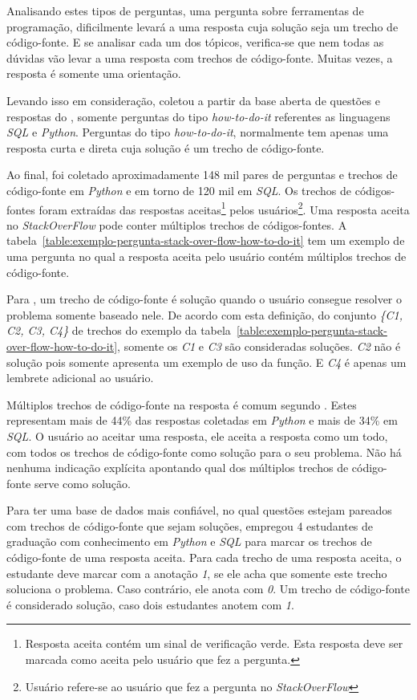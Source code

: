 Analisando estes tipos de perguntas, uma pergunta sobre ferramentas de programação, dificilmente levará a uma resposta cuja solução seja um trecho de código-fonte. E se analisar cada um dos tópicos, verifica-se que nem todas as dúvidas vão levar a uma resposta com trechos de código-fonte. Muitas vezes, a resposta é somente uma orientação.

Levando isso em consideração, \citeauthor{yao-2018} coletou a partir da base aberta de questões e respostas do \cite{stackoverflow-questions-topics-2019}, somente perguntas do tipo \textit{how-to-do-it} referentes as linguagens \textit{SQL} e \textit{Python}. Perguntas do tipo \textit{how-to-do-it}, normalmente tem apenas uma resposta curta e direta cuja solução é um trecho de código-fonte. 

Ao final, foi coletado aproximadamente 148 mil pares de perguntas e trechos de código-fonte em \emph{Python} e em torno de 120 mil em \emph{SQL}. Os trechos de códigos-fontes foram extraídas das respostas aceitas\footnote{Resposta aceita contém um sinal de verificação verde. Esta resposta deve ser marcada como aceita pelo usuário que fez a pergunta.} pelos usuários\footnote{Usuário refere-se ao usuário que fez a pergunta no \textit{StackOverFlow}}. Uma resposta aceita no \textit{StackOverFlow} pode conter múltiplos trechos de códigos-fontes. A tabela~\ref{table:exemplo-pergunta-stack-over-flow-how-to-do-it} tem um exemplo de uma pergunta no qual a resposta aceita pelo usuário contém múltiplos trechos de código-fonte.

Para \cite{yao-2018}, um trecho de código-fonte é solução quando o usuário consegue resolver o problema somente baseado nele.
De acordo com esta definição, do conjunto \emph{\{C1, C2, C3, C4\}} de trechos do exemplo da tabela~\ref{table:exemplo-pergunta-stack-over-flow-how-to-do-it}, somente os \emph{C1} e \emph{C3} são consideradas soluções. \emph{C2} não é solução pois somente apresenta um exemplo de uso da função. E \emph{C4} é apenas um lembrete adicional ao usuário.

Múltiplos trechos de código-fonte na resposta é comum segundo \cite{yao-2018}. Estes representam mais de 44\% das respostas coletadas em \textit{Python} e mais de 34\% em \textit{SQL}. O usuário ao aceitar uma resposta, ele aceita a resposta como um todo, com todos os trechos de código-fonte como solução para o seu problema. Não há nenhuma indicação explícita apontando qual dos múltiplos trechos de código-fonte serve como solução. 

Para ter uma base de dados mais confiável, no qual questões estejam pareados com trechos de código-fonte que sejam soluções, \cite{yao-2018} empregou 4 estudantes de graduação com conhecimento em \textit{Python} e \textit{SQL} para marcar os trechos de código-fonte de uma resposta aceita. Para cada trecho de uma resposta aceita, o estudante deve marcar com a anotação \emph{1}, se ele acha que somente este trecho soluciona o problema. Caso contrário, ele anota com \emph{0}. Um trecho de código-fonte é considerado solução, caso dois estudantes anotem com \emph{1}.

